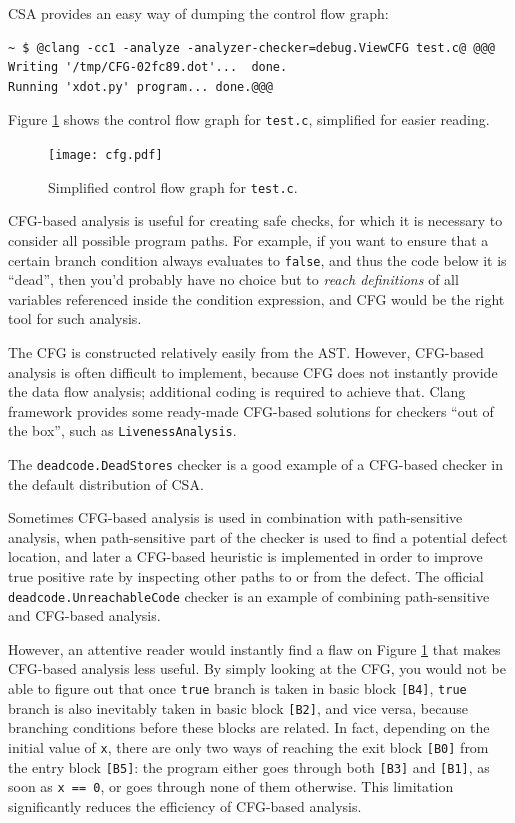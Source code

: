 \documentclass[a4paper,12pt]{article}
\newenvironment{nobr}{\begin{minipage}{\textwidth}\setlength\parskip{1em}
}{\end{minipage}\ignorespacesafterend}
\begin{document}
\begin{nobr}
CSA provides an easy way of dumping the control flow graph:

\begin{lstlisting}[style=commandline]
~ $ @clang -cc1 -analyze -analyzer-checker=debug.ViewCFG test.c@ @@@
Writing '/tmp/CFG-02fc89.dot'...  done.
Running 'xdot.py' program... done.@@@
\end{lstlisting}
\end{nobr}

Figure \ref{fig:cfg} shows the control flow graph for \lstinline|test.c|, simplified for easier reading.

\begin{figure}[!ht]\center
\texttt{[image: cfg.pdf]}
\caption{Simplified control flow graph for \lstinline|test.c|.}
\label{fig:cfg}
\end{figure}

CFG-based analysis is useful for creating safe checks, for which it is necessary to consider all possible program paths. For example, if you want to ensure that a certain branch condition always evaluates to \lstinline|false|, and thus the code below it is ``dead'', then you'd probably have no choice but to \emph{reach definitions} of all variables referenced inside the condition expression, and CFG would be the right tool for such analysis.

The CFG is constructed relatively easily from the AST. However, CFG-based analysis is often difficult to implement, because CFG does not instantly provide the data flow analysis; additional coding is required to achieve that. Clang framework provides some ready-made CFG-based solutions for checkers ``out of the box'', such as \lstinline|LivenessAnalysis|.

The \lstinline|deadcode.DeadStores| checker is a good example of a CFG-based checker in the default distribution of CSA.

Sometimes CFG-based analysis is used in combination with path-sensitive analysis, when path-sensitive part of the checker is used to find a potential defect location, and later a CFG-based heuristic is implemented in order to improve true positive rate by inspecting other paths to or from the defect. The official \lstinline|deadcode.UnreachableCode| checker is an example of combining path-sensitive and CFG-based analysis.

However, an attentive reader would instantly find a flaw on Figure \ref{fig:cfg} that makes CFG-based analysis less useful. By simply looking at the CFG, you would not be able to figure out that once \lstinline|true| branch is taken in basic block \lstinline|[B4]|, \lstinline|true| branch is also inevitably taken in basic block \lstinline|[B2]|, and vice versa, because branching conditions before these blocks are related. In fact, depending on the initial value of \lstinline|x|, there are only two ways of reaching the exit block \lstinline|[B0]| from the entry block \lstinline|[B5]|: the program either goes through both \lstinline|[B3]| and \lstinline|[B1]|, as soon as \lstinline|x == 0|, or goes through none of them otherwise. This limitation significantly reduces the efficiency of CFG-based analysis.
\end{document}
